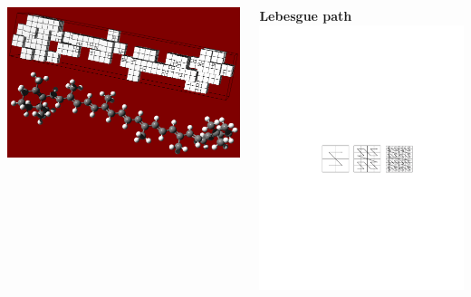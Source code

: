 \begin{frame}
    \begin{columns}
    \begin{column}{0.4\textwidth}
	\centering
	\includegraphics[angle=-90, scale=0.15]{figures/caroteneGrid.pdf}
    \end{column}
    \begin{column}{0.6\textwidth}
	\centering
	\textbf{Lebesgue path}
	\includegraphics[scale=0.5, viewport = 150 350 500 435, clip]{figures/lebesgue.pdf}


\end{column}
\end{columns}
\end{frame}
